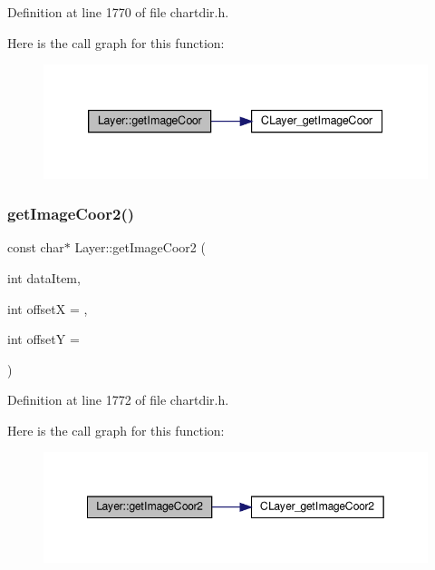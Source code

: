 Definition at line 1770 of file chartdir.\+h.

Here is the call graph for this function\+:
\nopagebreak
\begin{figure}[H]
\begin{center}
\leavevmode
\includegraphics[width=339pt]{class_layer_a8d8ff0e7b080f019c44e8a0b4080e6a0_cgraph}
\end{center}
\end{figure}
\mbox{\label{class_layer_ae23876451df3872e6b9ede9282b87fd8}} 
\subsubsection{\texorpdfstring{get\+Image\+Coor2()}{getImageCoor2()}}
{\footnotesize\ttfamily const char$\ast$ Layer\+::get\+Image\+Coor2 (\begin{DoxyParamCaption}\item[{int}]{data\+Item,  }\item[{int}]{offsetX = {},  }\item[{int}]{offsetY = {} }\end{DoxyParamCaption})\hspace{0.3cm}{\ttfamily [inline]}}



Definition at line 1772 of file chartdir.\+h.

Here is the call graph for this function\+:
\nopagebreak
\begin{figure}[H]
\begin{center}
\leavevmode
\includegraphics[width=349pt]{class_layer_ae23876451df3872e6b9ede9282b87fd8_cgraph}
\end{center}
\end{figure}
\mbox{\label{class_layer_abac4fdc0a21c39be0ac30f0d2448c3ff}} 
